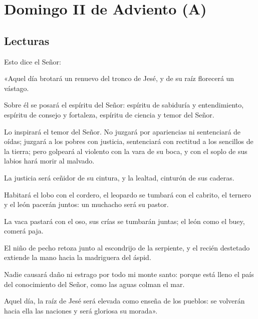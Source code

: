 \chapter{Domingo II de Adviento (A)}

	\section{Lecturas}


		 


		\begin{scripture}	
			Esto dice el Señor:
	
			«Aquel día brotará un renuevo del tronco de Jesé, y de su raíz florecerá un vástago.
	
			Sobre él se posará el espíritu del Señor: espíritu de sabiduría y entendimiento, espíritu de consejo y fortaleza, espíritu de ciencia y temor del Señor.
			
			Lo inspirará el temor del Señor. No juzgará por apariencias ni sentenciará de oídas; juzgará a los pobres con justicia, sentenciará con rectitud a los sencillos de la tierra; pero golpeará al violento con la vara de su boca, y con el soplo de sus labios hará morir al malvado.
			
			La justicia será ceñidor de su cintura, y la lealtad, cinturón de sus caderas.
			
			Habitará el lobo con el cordero, el leopardo se tumbará con el cabrito, el ternero y el león pacerán juntos: un muchacho será su pastor.
			
			La vaca pastará con el oso, sus crías se tumbarán juntas; el león como el buey, comerá paja.
			
			El niño de pecho retoza junto al escondrijo de la serpiente, y el recién destetado extiende la mano hacia la madriguera del áspid.
			
			Nadie causará daño ni estrago por todo mi monte santo: porque está lleno el país del conocimiento del Señor, como las aguas colman el mar.
			
			Aquel día, la raíz de Jesé será elevada como enseña de los pueblos: se volverán hacia ella las naciones y será gloriosa su morada».
		\end{scripture}
	
		
